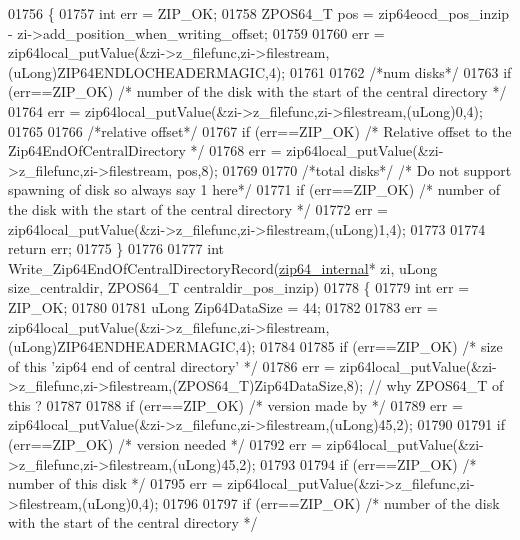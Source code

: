 \begin{DoxyCode}
01756 \{
01757   \textcolor{keywordtype}{int} err = ZIP\_OK;
01758   ZPOS64\_T pos = zip64eocd\_pos\_inzip - zi->add\_position\_when\_writing\_offset;
01759 
01760   err = zip64local\_putValue(&zi->z\_filefunc,zi->filestream,(uLong)ZIP64ENDLOCHEADERMAGIC,4);
01761 
01762   \textcolor{comment}{/*num disks*/}
01763     \textcolor{keywordflow}{if} (err==ZIP\_OK) \textcolor{comment}{/* number of the disk with the start of the central directory */}
01764       err = zip64local\_putValue(&zi->z\_filefunc,zi->filestream,(uLong)0,4);
01765 
01766   \textcolor{comment}{/*relative offset*/}
01767     \textcolor{keywordflow}{if} (err==ZIP\_OK) \textcolor{comment}{/* Relative offset to the Zip64EndOfCentralDirectory */}
01768       err = zip64local\_putValue(&zi->z\_filefunc,zi->filestream, pos,8);
01769 
01770   \textcolor{comment}{/*total disks*/} \textcolor{comment}{/* Do not support spawning of disk so always say 1 here*/}
01771     \textcolor{keywordflow}{if} (err==ZIP\_OK) \textcolor{comment}{/* number of the disk with the start of the central directory */}
01772       err = zip64local\_putValue(&zi->z\_filefunc,zi->filestream,(uLong)1,4);
01773 
01774     \textcolor{keywordflow}{return} err;
01775 \}
01776 
01777 \textcolor{keywordtype}{int} Write\_Zip64EndOfCentralDirectoryRecord(\hyperlink{structzip64__internal}{zip64\_internal}* zi, uLong size\_centraldir, 
      ZPOS64\_T centraldir\_pos\_inzip)
01778 \{
01779   \textcolor{keywordtype}{int} err = ZIP\_OK;
01780 
01781   uLong Zip64DataSize = 44;
01782 
01783   err = zip64local\_putValue(&zi->z\_filefunc,zi->filestream,(uLong)ZIP64ENDHEADERMAGIC,4);
01784 
01785   \textcolor{keywordflow}{if} (err==ZIP\_OK) \textcolor{comment}{/* size of this 'zip64 end of central directory' */}
01786     err = zip64local\_putValue(&zi->z\_filefunc,zi->filestream,(ZPOS64\_T)Zip64DataSize,8); \textcolor{comment}{// why ZPOS64\_T of
       this ?}
01787 
01788   \textcolor{keywordflow}{if} (err==ZIP\_OK) \textcolor{comment}{/* version made by */}
01789     err = zip64local\_putValue(&zi->z\_filefunc,zi->filestream,(uLong)45,2);
01790 
01791   \textcolor{keywordflow}{if} (err==ZIP\_OK) \textcolor{comment}{/* version needed */}
01792     err = zip64local\_putValue(&zi->z\_filefunc,zi->filestream,(uLong)45,2);
01793 
01794   \textcolor{keywordflow}{if} (err==ZIP\_OK) \textcolor{comment}{/* number of this disk */}
01795     err = zip64local\_putValue(&zi->z\_filefunc,zi->filestream,(uLong)0,4);
01796 
01797   \textcolor{keywordflow}{if} (err==ZIP\_OK) \textcolor{comment}{/* number of the disk with the start of the central directory */}

\end{DoxyCode}
